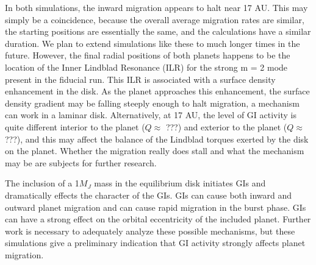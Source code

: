 \documentclass[12pt,manuscript,authoryear]{aastex}
\begin{document}
In both simulations, the inward migration appears to halt near 17 AU. This may simply be a coincidence, because the overall average migration rates are similar, the starting positions are essentially the same, and the calculations have a similar duration. We plan to extend simulations like these to much longer times in the future. However, the final radial positions of both planets happens to be the location of the Inner Lindblad Resonance (ILR) for the strong m = 2 mode present in the fiducial run. This ILR is associated with a surface density enhancement in the disk. 
As the planet approaches this enhancement, the surface density gradient may be falling steeply enough to halt migration, a mechanism can work in a laminar disk. 
Alternatively, at 17 AU, the level of GI activity is quite different interior to the planet ($Q \approx$ ???) and exterior to the planet ($Q \approx$ ???), and this may affect the balance of the Lindblad torques exerted by the disk on the planet. Whether the migration really does stall and what the mechanism may be are subjects for further research.

The inclusion of a 1$M_J$ mass in the equilibrium disk initiates GIs and dramatically effects the character of the GIs. GIs can cause both inward and outward planet migration and can cause rapid migration in the burst phase.
GIs can have a strong effect on the orbital eccentricity of the included planet.
Further work is necessary to adequately analyze these possible mechanisms, but these simulations give a preliminary indication that GI activity strongly affects planet migration.
\end{document}

